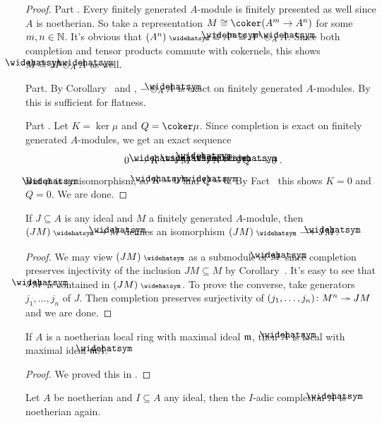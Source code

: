 \documentclass[a4paper,parskip=half,numbers=enddot, DIV=12]{scrreprt}
\begin{document}
\begin{proof}
	Part . Every finitely generated $A$-module is finitely presented as well since $A$ is noetherian. So take a representation $M\cong \coker(A^m\morphism A^n)$ for some $m,n\in\mathbb{N}$. It's obvious that $(A^n)^\complete\cong \roof{A}^n\cong A^n\otimes_A\roof{A}$. Since both completion and tensor products commute with cokernels, this shows $\roof{M}\cong M\otimes_A\roof{A}$ as well.
	
	Part. By Corollary~ and , $-\otimes_A\roof{A}$ is exact on finitely generated $A$-modules. By \cite[Proposition~1.2.2]{homalg} this is sufficient for flatness.
	
	Part . Let $K=\ker\mu$ and $Q=\coker\mu$. Since completion is exact on finitely generated $A$-modules, we get an exact sequence
	\begin{align*}
		0\morphism \roof{K}\morphism\roof{M}\morphism[\roof{\mu}]\roof{N}\morphism\roof{Q}\morphism 0\;.
	\end{align*}
	But $\roof{\mu}$ is an isomorphism, so $\roof{K}=0$ and $\roof{Q}=0$. By Fact~ this shows $K=0$ and $Q=0$. We are done.
\end{proof}
\begin{cor}
	If $J\subseteq A$ is any ideal and $M$ a finitely generated $A$-module, then $(JM)^\complete\morphism\roof{M}$ defines an isomorphism $(JM)^\complete\isomorphism J\roof{M}$.
\end{cor}
\begin{proof}
	We may view $(JM)^\complete$ as a submodule of $\roof{M}$ since completion preserves injectivity of the inclusion $JM\subseteq M$ by Corollary~. It's easy to see that $J\roof{M}$ is contained in $(JM)^\complete$. To prove the converse, take generators $j_1,\ldots,j_n$ of $J$. Then completion preserves surjectivity of $(j_1,\ldots,j_n)\colon M^n\epimorphism JM$ and we are done.
\end{proof}
\begin{cor}
	If $A$ is a noetherian local ring with maximal ideal $\mathfrak{m}$, then $\roof{A}$ is local with maximal ideal $\mm \roof{A}$.
\end{cor}
\begin{proof}
	We proved this in \cite[Corollary~2.2.2]{homalg}.
\end{proof}
\begin{prop}
	Let $A$ be noetherian and $I\subseteq A$ any ideal, then the $I$-adic completion $\roof{A}$ is noetherian again.
\end{prop}
\end{document}
